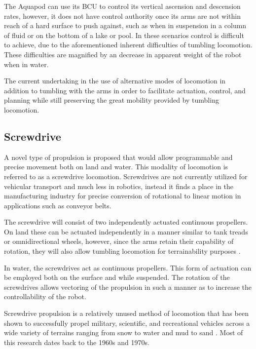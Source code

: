 The Aquapod can use its BCU to control its vertical ascension and descension
rates, however, it does not have control authority once its arms are not within
reach of a hard surface to push against, such as when in suspension in a column
of fluid or on the bottom of a lake or pool. In these scenarios control is
difficult to achieve, due to the aforementioned inherent difficulties of
tumbling locomotion. These difficulties are magnified by an decrease in apparent
weight of the robot when in water.

The current undertaking in the use of alternative modes of locomotion in
addition to tumbling with the arms in order to facilitate actuation, control,
and planning while still preserving the great mobility provided by tumbling
locomotion.



\subsection{Screwdrive}

A novel type of propulsion is proposed that would allow programmable and precise
movement both on land and water. This modality of locomotion is referred to as a
screwdrive locomotion. Screwdrives are not currently utilized for vehicular
transport and much less in robotics, instead it finds a place in the
manufacturing industry for precise conversion of rotational to linear motion in
applications such as conveyor belts.


The screwdrive will consist of two independently actuated continuous propellers.
On land these can be actuated independently in a manner similar to tank treads
or omnidirectional wheels, however, since the arms retain their capability of
rotation, they will also allow tumbling locomotion for terrainability purposes .

In water, the screwdrives act as continuous propellers. This form of actuation
can be employed both on the surface and while suspended. The rotation of the
screwdrives allows vectoring of the propulsion in such a manner as to increase
the controllability of the robot.

Screwdrive propulsion is a relatively unused method of locomotion that has been
shown to successfully propel military, scientific, and recreational vehicles
across a wide variety of terrains ranging from snow to water and mud to sand
\cite{Fales1972, Cole1961c, Dugoff1967}. Most of this research dates back to the
1960s and 1970s.



